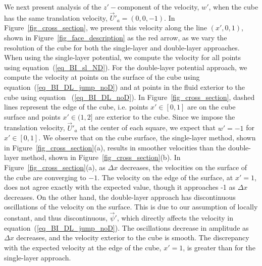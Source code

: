 We next present analysis of the $z'-$component of the velocity, $w'$, when the cube has the same translation velocity, $\vec{U}'_a = (0,0,-1)$.
In Figure~\ref{fig_cross_section}, we present this velocity along the line $(x',0,1)$,  shown in Figure~\ref{fig_face_description} as the red arrow, 
as we vary the resolution of the cube for both the single-layer and double-layer approaches.
When using the single-layer potential, we 
compute the velocity for all points using equation~(\ref{eq_BI_sl_ND}). For the double-layer potential approach, we 
compute the velocity at points on the surface of the cube using equation~(\ref{eq_BI_DL_jump_noD})  and at points in the fluid exterior to the cube using equation ~(\ref{eq_BI_DL_noD}).
In Figure~\ref{fig_cross_section}, dashed lines represent the edge of the cube,  i.e. points $x' \in [0,1]$ are on the cube surface and points $x' \in (1,2]$ are exterior to the cube. Since we impose the translation velocity, $\vec{U}'_{a}$ at the center of each square, we expect that $w'= -1$ for $x' \in [0,1]$.
We observe that on the cube surface, the single-layer method, shown in Figure~\ref{fig_cross_section}(a), results in smoother velocities than the double-layer method, shown in  Figure~\ref{fig_cross_section}(b).
In Figure~\ref{fig_cross_section}(a), as $\Delta x$ decreases, the velocities on the surface of the cube are converging to $-1$. The velocity on the edge of the surface, at $x' = 1$, does not agree exactly with the expected value, though it approaches -1  as $\Delta x$ decreases.  On the other hand, the double-layer approach has discontinuous oscillations of the velocity on the surface. This is due to our assumption of locally constant, and thus discontinuous, $\vec{\psi}'$, which directly affects the velocity in equation~(\ref{eq_BI_DL_jump_noD}).  The oscillations decrease in amplitude as $\Delta x$ decreases, and the velocity exterior to the cube is smooth. The discrepancy with the expected velocity at the edge of the cube, $x' =1$, is greater than for the single-layer approach.

